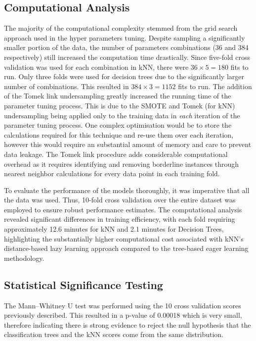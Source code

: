 \documentclass[10pt, conference]{IEEEtran}
\begin{document}
\subsection{Computational Analysis}
The majority of the computational complexity stemmed from the grid search approach used in the hyper parameters tuning. Despite sampling a significantly smaller portion of the data, the number of parameters combinations (36 and 384 respectively)  still increased the computation time drastically. Since five-fold cross validation was used for each combination in kNN, there were $36 \times 5 = 180$ fits to run. Only three folds were used for decision trees due to the significantly larger number of combinations. This resulted in $384 \times 3 = 1152$ fits to run. The addition of the Tomek link undersampling greatly increased the running time of the parameter tuning process. This is due to the SMOTE and Tomek (for kNN) undersampling being applied only to the training data in \textit{each} iteration of the parameter tuning process. One complex optimisation would be to store the calculations required for this technique and re-use them over each iteration, however this would require an substantial amount of memory and care to prevent data leakage. The Tomek link procedure adds considerable computational overhead as it requires identifying and removing borderline instances through nearest neighbor calculations for every data point in each training fold.

To evaluate the performance of the models thoroughly, it was imperative that all the data was used. Thus, 10-fold cross validation over the entire dataset was employed to ensure robust performance estimates. The computational analysis revealed significant differences in training efficiency, with each fold requiring approximately 12.6 minutes for kNN and 2.1 minutes for Decision Trees, highlighting the substantially higher computational cost associated with kNN's distance-based lazy learning approach compared to the tree-based eager learning methodology.

\subsection{Statistical Significance Testing}
The Mann–Whitney U test \cite{mann1947test} was performed using the 10 cross validation scores previously described. This resulted in a p-value of 0.00018 which is very small, therefore indicating there is strong evidence to reject the null hypothesis that the classification trees and the kNN scores come from the same distribution.
\end{document}
